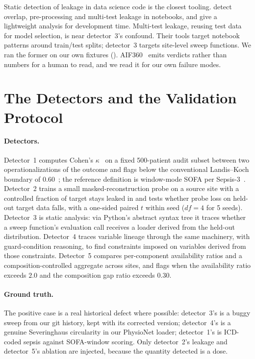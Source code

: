 \documentclass[pmlr,twocolumn,10pt]{jmlr}
\begin{document}
Static detection of leakage in data science code is the closest tooling.
\citet{yang2022leakage} detect overlap, pre-processing and multi-test leakage in
notebooks, and \citet{subotic2022leakage} give a lightweight analysis for
development time. Multi-test leakage, reusing test data for model selection, is
near detector~3's confound. Their tools target notebook patterns around
train/test splits; detector~3 targets site-level sweep functions. We ran the
former on our own fixtures (). AIF360~\citep{bellamy2019aif360}
emits verdicts rather than numbers for a human to read, and we read it for our
own failure modes.

\section{The Detectors and the Validation Protocol}
\label{sec:methods}

\paragraph{Detectors.} Detector~1 computes Cohen's $\kappa$~\citep{cohen1960kappa}
on a fixed 500-patient audit subset between two operationalizations of the
outcome and flags below the conventional Landis--Koch
boundary of $0.60$~\citep{landis1977measurement}; the reference definition is
window-mode SOFA per Sepsis-3~\citep{singer2016sepsis3}. Detector~2 trains a
small masked-reconstruction probe on a source site with a controlled fraction of
target stays leaked in and tests whether probe loss on held-out target data
falls, with a one-sided paired $t$ within seed ($df=4$ for 5 seeds). Detector~3
is static analysis: via Python's abstract syntax tree it traces whether a sweep
function's evaluation call receives a loader derived from the held-out
distribution. Detector~4 traces variable lineage through the same machinery,
with guard-condition reasoning, to find constraints imposed on variables derived
from those constraints. Detector~5 compares per-component availability ratios
and a composition-controlled aggregate across sites, and flags when the
availability ratio exceeds $2.0$ and the composition gap ratio exceeds $0.30$.

\paragraph{Ground truth.} The positive case is a real historical defect where
possible: detector~3's is a buggy sweep from our git history, kept with its
corrected version; detector~4's is a genuine Severinghaus circularity in our
PhysioNet loader; detector~1's is ICD-coded sepsis against SOFA-window scoring.
Only detector~2's leakage and detector~5's ablation are injected, because the
quantity detected is a dose.
\end{document}
